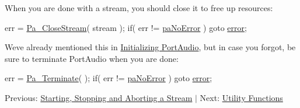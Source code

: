 When you are done with a stream, you should close it to free up resources\+:


\begin{DoxyCode}
err = \hyperlink{portaudio_8h_a92f56f88cbd14da0e8e03077e835d104}{Pa\_CloseStream}( stream );
\textcolor{keywordflow}{if}( err != \hyperlink{portaudio_8h_a2e45bf8b5145f131a91c128af2bdaec7aeb09d15a48b6c1034728a9c518cfe4ba}{paNoError} ) \textcolor{keywordflow}{goto} \hyperlink{sndfile__load_8m_a3a81ee160b23b01b04b7c08b35123218}{error};
\end{DoxyCode}


We\textquotesingle{}ve already mentioned this in \hyperlink{initializing_portaudio}{Initializing Port\+Audio}, but in case you forgot, be sure to terminate Port\+Audio when you are done\+:


\begin{DoxyCode}
err = \hyperlink{portaudio_8h_a0db317604e916e8bd6098e60e6237221}{Pa\_Terminate}( );
\textcolor{keywordflow}{if}( err != \hyperlink{portaudio_8h_a2e45bf8b5145f131a91c128af2bdaec7aeb09d15a48b6c1034728a9c518cfe4ba}{paNoError} ) \textcolor{keywordflow}{goto} \hyperlink{sndfile__load_8m_a3a81ee160b23b01b04b7c08b35123218}{error};
\end{DoxyCode}


Previous\+: \hyperlink{start_stop_abort}{Starting, Stopping and Aborting a Stream} $\vert$ Next\+: \hyperlink{utility_functions}{Utility Functions} 
